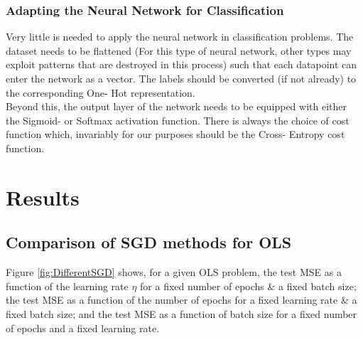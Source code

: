 \documentclass[11pt,a4paper,titlepage]{article}
\begin{document}
\subsubsection{Adapting the Neural Network for Classification}
Very little is needed to apply the neural network in classification problems. The dataset needs to be flattened (For this type of neural network, other types may exploit patterns that are destroyed in this process) such that each datapoint can enter the network as a vector. The labels should be converted (if not already) to the corresponding One- Hot representation.\\Beyond this, the output layer of the network needs to be equipped with either the Sigmoid- or Softmax activation function. There is always the choice of cost function which, invariably for our purposes should be the Cross- Entropy cost function.
\section{Results}
\subsection{Comparison of SGD methods for OLS}
Figure \ref{fig:DifferentSGD} shows, for a given OLS problem, the test MSE as a function of the learning rate $\eta$ for a fixed number of epochs \& a fixed batch size; the test MSE as a function of the number of epochs for a fixed learning rate \& a fixed batch size; and the test MSE as a function of batch size for a fixed number of epochs and a fixed learning rate. 
\end{document}
